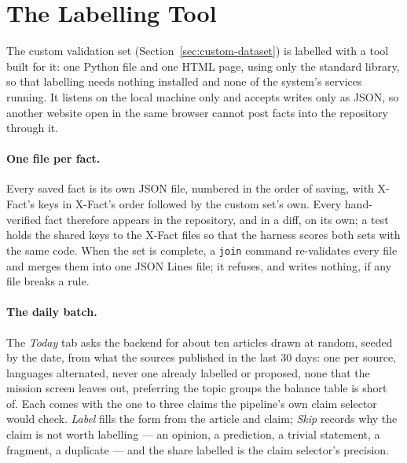 
\section{The Labelling Tool}
\label{sec:dev-labeller}

The custom validation set (Section~\ref{sec:custom-dataset}) is labelled
with a tool built for it: one Python file and one HTML page, using only
the standard library, so that labelling needs nothing installed and
none of the system's services running. It listens on the local machine
only and accepts writes only as JSON, so another website open in the
same browser cannot post facts into the repository through it.

\paragraph{One file per fact.} Every saved fact is its own JSON file,
numbered in the order of saving, with X-Fact's keys in X-Fact's order
followed by the custom set's own. Every hand-verified fact therefore
appears in the repository, and in a diff, on its own; a test holds the
shared keys to the X-Fact files so that the harness scores both sets
with the same code. When the set is complete, a \texttt{join} command
re-validates every file and merges them into one JSON Lines file; it
refuses, and writes nothing, if any file breaks a rule.

\paragraph{The daily batch.} The \emph{Today} tab asks the backend for
about ten articles drawn at random, seeded by the date, from what the
sources published in the last 30 days: one per source, languages
alternated, never one already labelled or proposed, none that the
mission screen leaves out, preferring the topic groups the balance
table is short of. Each comes with the one to three claims the
pipeline's own claim selector would check. \emph{Label} fills the form
from the article and claim; \emph{Skip} records why the claim is not
worth labelling --- an opinion, a prediction, a trivial statement, a
fragment, a duplicate --- and the share labelled is the claim
selector's precision.

